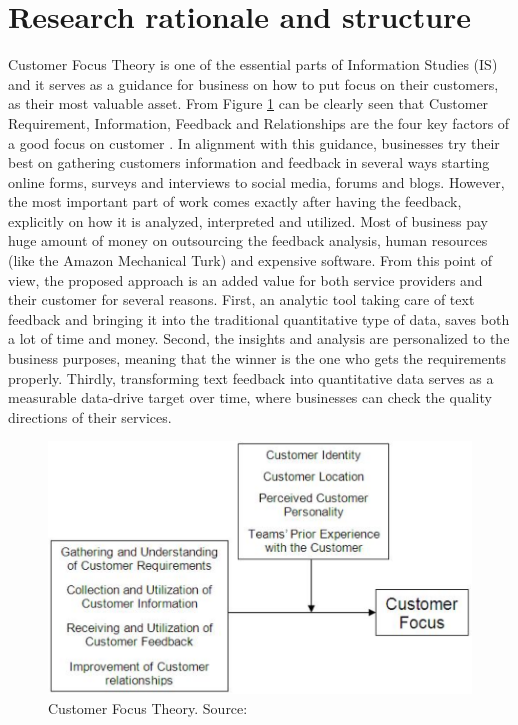 \section{Research rationale and structure}
Customer Focus Theory is one of the essential parts of Information Studies (IS) and it serves as a guidance for business on how to put focus on their customers, as their most valuable asset. From Figure \ref{fig:cusfoc} can be clearly seen that Customer Requirement, Information, Feedback and Relationships are the four key factors of a good focus on customer \cite{lohan2011examining}. In alignment with this guidance, businesses try their best on gathering customers information and feedback in several ways starting online forms, surveys and interviews to social media, forums and blogs. However, the most important part of work comes exactly after having the feedback, explicitly on how it is analyzed, interpreted and utilized. Most of business pay huge amount of money on outsourcing the feedback analysis, human resources (like the Amazon Mechanical Turk) and expensive software. From this point of view, the proposed approach is an added value for both service providers and their customer for several reasons. First, an analytic tool taking care of text feedback and bringing it into the traditional quantitative type of data, saves both a lot of time and money. Second, the insights and analysis are personalized to the business purposes, meaning that the winner is the one who gets the requirements properly. Thirdly, transforming text feedback into quantitative data serves as a measurable data-drive target over time, where businesses can check the quality directions of their services.
\begin{figure}[h!]
	\centering
	\includegraphics[height=0.25\textheight]{fig01/CustomerFocus}
	\caption{Customer Focus Theory. Source: \cite{lohan2011examining}}
	\label{fig:cusfoc}
\end{figure}

